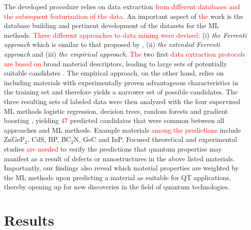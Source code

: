 \documentclass[superscriptaddress,unsortedaddress,
 amsmath,amssymb,
 aps,
]{revtex4-2}
\newcommand{\mrk}[1]{\textcolor{red}{#1}}
\begin{document}
The developed procedure relies on data extraction \mrk{from different databases and the subsequent featurization of the data.} 
An important aspect of \mrk{the} work is the database building and pertinent development of the datasets for the ML methods. \mrk{Three different approaches to data mining were devised}: (i) \emph{the Ferrenti approach} which is similar to that proposed by \citeauthor{Ferrenti2020} \cite{Ferrenti2020}, (ii) \emph{the extended Ferrenti approach} and (iii) \emph{the empirical approach}. \mrk{The} two first \mrk{data extraction protocols are based on} broad material descriptors, leading to large sets of potentially suitable candidates \cite{Mehta2019,Hastie2009}. The empirical approach, on the other hand, relies on including materials with experimentally proven advantageous characteristics in the training set and therefore yields a narrower set of possible candidates. The three resulting sets of labeled data were then analyzed with the four supervised ML methods logistic regression, decision trees, random forests and gradient boosting \cite{Hastie2009,Murphy2012}, yielding \mrk{$47$} predicted candidates that were common between all approaches and ML methods.
Example materials \mrk{among the predictions} include ZnGeP$_2$, CdS, BP, BC$_2$N, GeC and InP. Focused theoretical and experimental studies 
\mrk{are needed} to verify the predictions that quantum properties may manifest as a result of defects or nanostructures in the above listed materials. 
Importantly, our findings also reveal which material properties are weighted by the ML methods upon predicting a material as suitable for QT applications, thereby opening up for new  discoveries in the field of quantum technologies. 


\section*{Results}
\end{document}
